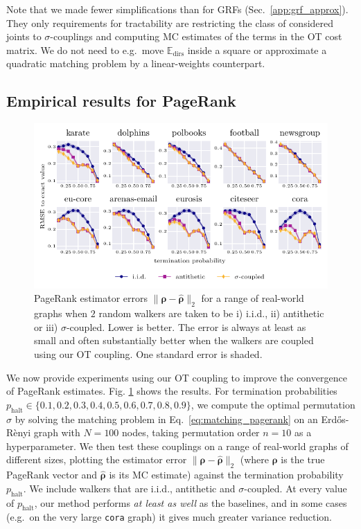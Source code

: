 Note that we made fewer simplifications than for GRFs (Sec.~\ref{app:grf_approx}). 
They only requirements for tractability are restricting the class of considered joints to $\sigma$-couplings and computing MC estimates of the terms in the OT cost matrix.
We do not need to e.g.~move $\mathbb{E}_\textrm{dirs}$ inside a square or approximate a quadratic matching problem by a linear-weights counterpart. 


\subsection{Empirical results for PageRank} \label{app:more_pagerank_results}
\begin{figure}
    \centering
    \includegraphics{images/pagerank_more_graphs_14_may.pdf}
    \caption{PageRank estimator errors $\|\boldsymbol{\rho} - \widehat{\boldsymbol{\rho}}\|_2$ for a range of real-world graphs when $2$ random walkers are taken to be i) i.i.d., ii) antithetic or iii) $\sigma$-coupled. Lower is better. The error is always at least as small and often substantially better when the walkers are coupled using our OT coupling. 
    One standard error is shaded.}
    \label{fig:pagerank_results}
\end{figure}
We now provide experiments using our OT coupling to improve the convergence of PageRank estimates. 
Fig. \ref{fig:pagerank_results} shows the results.
For termination probabilities $p_\textrm{halt} \in \{0.1,0.2,0.3,0.4,0.5,0.6,0.7,0.8,0.9 \}$, we compute the optimal permutation $\sigma$ by solving the matching problem in Eq.~\ref{eq:matching_pagerank} on an Erd\H os-R\`enyi graph with $N=100$ nodes, taking permutation order $n=10$ as a hyperparameter.
We then test these couplings on a range of real-world graphs \citep{community_graphs} of different sizes, plotting the estimator error $\|\boldsymbol{\rho} - \widehat{\boldsymbol{\rho}}\|_2$ (where $\boldsymbol{\rho}$ is the true PageRank vector and $\widehat{\boldsymbol{\rho}}$ is its MC estimate) against the termination probability $p_\textrm{halt}$. 
We include walkers that are i.i.d., antithetic \citep{reid2023quasi} and $\sigma$-coupled. 
At every value of $p_\textrm{halt}$, our method performs \emph{at least as well} as the baselines, and in some cases (e.g.~on the very large \lstinline{cora} graph) it gives much greater variance reduction.

